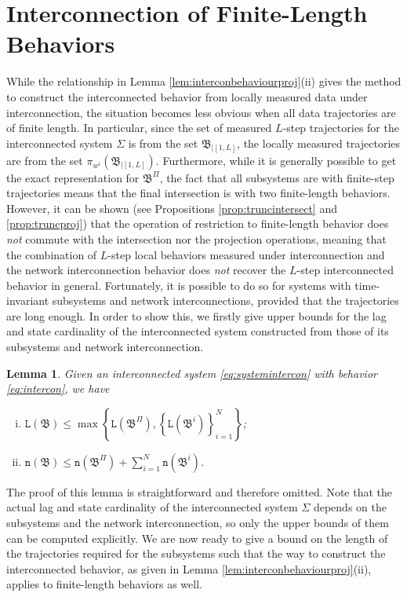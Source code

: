 \documentclass[11pt,print,draftcls,onecolumn,romanappendices]{ieeecolor}
\newtheorem{lem}[thm]{Lemma}
\newcommand{\n}[1]{\mathtt{n}\left(#1\right)}
\newcommand{\lag}[1]{\mathtt{L}\left(#1\right)}
\newcommand{\proj}[2]{\pi_{#1}\left(#2\right)}
\newcommand{\B}{\mathfrak{B}}
\newcommand{\bint}[1]{{|[#1]}}
\begin{document}
\section{Interconnection of Finite-Length Behaviors}\label{sec:interconbehavior}
While the relationship in Lemma \ref{lem:interconbehaviourproj}(ii) gives the method to construct the interconnected behavior from locally measured data under interconnection, the situation becomes less obvious when all data trajectories are of finite length. In particular, since the set of measured $L$-step trajectories for the interconnected system $\Sigma$ is from the set $\B_\bint{1,L}$, the locally measured trajectories are from the set $\proj{w^i}{\B_\bint{1,L}}$. Furthermore, while it is generally possible to get the exact representation for $\B^\Pi$, the fact that all subsystems are with finite-step trajectories means that the final intersection is with two finite-length behaviors. However, it can be shown (see Propositions \ref{prop:truncintersect} and \ref{prop:truncproj}) that the operation of restriction to finite-length behavior does \emph{not} commute with the intersection nor the projection operations, meaning that the combination of $L$-step local behaviors measured under interconnection and the network interconnection behavior does \emph{not} recover the $L$-step interconnected behavior in general. Fortunately, it is possible to do so for systems with time-invariant subsystems and network interconnections, provided that the trajectories are long enough. In order to show this, we firstly give upper bounds for the lag and state cardinality of the interconnected system constructed from those of its subsystems and network interconnection.
\begin{lem}\label{lem:interconproperty}
	Given an interconnected system \eqref{eq:systemintercon} with behavior \eqref{eq:intercon}, we have
	\begin{enumerate}[(i)]
		\item $\lag{\B}\leq\max\left\{\lag{\B^\Pi},\left\{\lag{\B^i}\right\}_{i=1}^N\right\}$;
		\item $\n{\B}\leq\n{\B^\Pi}+\sum_{i=1}^{N}\n{\B^i}$.
	\end{enumerate}
\end{lem}
The proof of this lemma is straightforward and therefore omitted. Note that the actual lag and state cardinality of the interconnected system $\Sigma$ depends on the subsystems and the network interconnection, so only the upper bounds of them can be computed explicitly. We are now ready to give a bound on the length of the trajectories required for the subsystems such that the way to construct the interconnected behavior, as given in Lemma \ref{lem:interconbehaviourproj}(ii), applies to finite-length behaviors as well.
\end{document}
